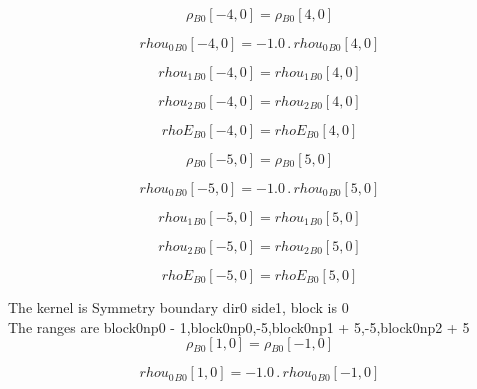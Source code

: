 \documentclass{article}
\begin{document}
\begin{dmath}{\rho{_{B0}}}[{-4,0}] = {\rho{_{B0}}}[{4,0}]\end{dmath}

\begin{dmath}{rhou_{0}{_{B0}}}[{-4,0}] = - 1.0 \,.\, {rhou_{0}{_{B0}}}[{4,0}]\end{dmath}

\begin{dmath}{rhou_{1}{_{B0}}}[{-4,0}] = {rhou_{1}{_{B0}}}[{4,0}]\end{dmath}

\begin{dmath}{rhou_{2}{_{B0}}}[{-4,0}] = {rhou_{2}{_{B0}}}[{4,0}]\end{dmath}

\begin{dmath}{rhoE{_{B0}}}[{-4,0}] = {rhoE{_{B0}}}[{4,0}]\end{dmath}

\begin{dmath}{\rho{_{B0}}}[{-5,0}] = {\rho{_{B0}}}[{5,0}]\end{dmath}

\begin{dmath}{rhou_{0}{_{B0}}}[{-5,0}] = - 1.0 \,.\, {rhou_{0}{_{B0}}}[{5,0}]\end{dmath}

\begin{dmath}{rhou_{1}{_{B0}}}[{-5,0}] = {rhou_{1}{_{B0}}}[{5,0}]\end{dmath}

\begin{dmath}{rhou_{2}{_{B0}}}[{-5,0}] = {rhou_{2}{_{B0}}}[{5,0}]\end{dmath}

\begin{dmath}{rhoE{_{B0}}}[{-5,0}] = {rhoE{_{B0}}}[{5,0}]\end{dmath}

\noindent The kernel is Symmetry boundary dir0 side1, block is 0\\\noindent The ranges are block0np0 - 1,block0np0,-5,block0np1 + 5,-5,block0np2 + 5\\\begin{dmath}{\rho{_{B0}}}[{1,0}] = {\rho{_{B0}}}[{-1,0}]\end{dmath}

\begin{dmath}{rhou_{0}{_{B0}}}[{1,0}] = - 1.0 \,.\, {rhou_{0}{_{B0}}}[{-1,0}]\end{dmath}
\end{document}
